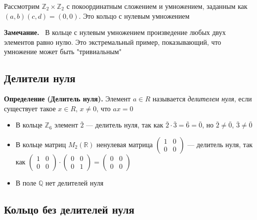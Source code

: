 \documentclass[a4paper,12pt]{article}
\newcommand{\myremark}{\textbf{Замечание.}\ }
\theoremstyle{definition}
\theoremstyle{plain}
\theoremstyle{remark}
\begin{document}
	\begin{tcolorbox}[colback=gray!5, colframe=gray!50, title=Пример кольца с нулевым умножением]
		Рассмотрим $\mathbb{Z}_2 \times \mathbb{Z}_2$ с покоординатным сложением и умножением, заданным как $(a,b)(c,d) = (0,0)$. Это кольцо с нулевым умножением
	\end{tcolorbox}
	
	\myremark
	В кольце с нулевым умножением произведение любых двух элементов равно нулю. Это экстремальный пример, показывающий, что умножение может быть "тривиальным"
	
	\subsection{Делители нуля}
	
	\noindent \textbf{Определение (Делитель нуля).}
	Элемент $a \in R$ называется \textit{делителем нуля}, если существует такое $x \in R$, $x \neq 0$, что $ax = 0$
	
	\begin{tcolorbox}[colback=blue!5, colframe=blue!40!black, title=Примеры делителей нуля]
		\begin{itemize}
			\item В кольце $\mathbb{Z}_6$ элемент $\bar{2}$ — делитель нуля, так как $\bar{2} \cdot \bar{3} = \bar{6} = \bar{0}$, но $\bar{2} \neq \bar{0}$, $\bar{3} \neq \bar{0}$
			\item В кольце матриц $M_2(\mathbb{R})$ ненулевая матрица $\begin{pmatrix} 1 & 0 \\ 0 & 0 \end{pmatrix}$ — делитель нуля, так как $\begin{pmatrix} 1 & 0 \\ 0 & 0 \end{pmatrix} \cdot \begin{pmatrix} 0 & 0 \\ 0 & 1 \end{pmatrix} = \begin{pmatrix} 0 & 0 \\ 0 & 0 \end{pmatrix}$
			\item В поле $\mathbb{Q}$ нет делителей нуля
		\end{itemize}
	\end{tcolorbox}
	
	\subsection{Кольцо без делителей нуля}
	
\end{document}
